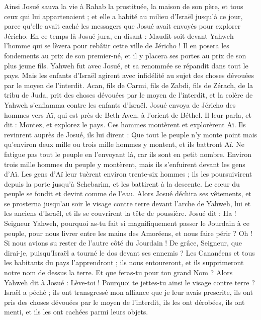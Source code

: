 \begin{multicols}{2}
Ainsi Josué sauva la vie à Rahab la prostituée, la maison de son père, et tous ceux qui lui appartenaient ; et elle a habité au milieu d’Israël jusqu’à ce jour, parce qu’elle avait caché les messagers que Josué avait envoyés pour explorer Jéricho.
En ce temps-là Josué jura, en disant : Maudit soit devant Yahweh l’homme qui se lèvera pour rebâtir cette ville de Jéricho ! Il en posera les fondements au prix de son premier-né, et il y placera ses portes au prix de son plus jeune fils\FTNT{}.
Yahweh fut avec Josué, et sa renommée se répandit dans tout le pays.
\VerseOne{}Mais les enfants d’Israël agirent avec infidélité au sujet des choses dévouées par le moyen de l'interdit. Acan, fils de Carmi, fils de Zabdi, fils de Zérach, de la tribu de Juda, prit des choses dévouées par le moyen de l'interdit, et la colère de Yahweh s’enflamma contre les enfants d’Israël.
Josué envoya de Jéricho des hommes vers Aï, qui est près de Beth-Aven, à l’orient de Béthel. Il leur parla, et dit : Montez, et explorez le pays. Ces hommes montèrent et explorèrent Aï.
Ils revinrent auprès de Josué, ils lui dirent : Que tout le peuple n’y monte point mais qu’environ deux mille ou trois mille hommes y montent, et ils battront Aï. Ne fatigue pas tout le peuple en l’envoyant là, car ils sont en petit nombre.
Environ trois mille hommes du peuple y montèrent, mais ils s’enfuirent devant les gens d’Aï.
Les gens d’Aï leur tuèrent environ trente-six hommes ; ils les poursuivirent depuis la porte jusqu’à Schebarim, et les battirent à la descente. Le cœur du peuple se fondit et devint comme de l’eau.
Alors Josué déchira ses vêtements, et se prosterna jusqu’au soir le visage contre terre devant l’arche de Yahweh, lui et les anciens d’Israël, et ils se couvrirent la tête de poussière.
Josué dit : Ha ! Seigneur Yahweh, pourquoi as-tu fait si magnifiquement passer le Jourdain à ce peuple, pour nous livrer entre les mains des Amoréens, et nous faire périr ? Oh ! Si nous avions su rester de l’autre côté du Jourdain !
De grâce, Seigneur, que dirai-je, puisqu’Israël a tourné le dos devant ses ennemis ?
Les Cananéens et tous les habitants du pays l’apprendront ; ils nous entoureront, et ils supprimeront notre nom de dessus la terre. Et que feras-tu pour ton grand Nom ?
Alors Yahweh dit à Josué : Lève-toi ! Pourquoi te jettes-tu ainsi le visage contre terre ?
Israël a péché ; ils ont transgressé mon alliance que je leur avais prescrite, ils ont pris des choses dévouées par le moyen de l'interdit, ils les ont dérobées, ils ont menti, et ils les ont cachées parmi leurs objets\FTNT{}.

\end{multicols}
